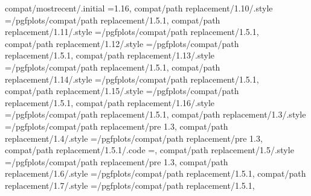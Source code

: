 {{{{{{{{{{{{{{{{{{{compat/mostrecent/.initial                                         =1.16,                                                                                                                              
compat/path replacement/1.10/.style                                ={/pgfplots/compat/path replacement/1.5.1},                                                                                         
compat/path replacement/1.11/.style                                ={/pgfplots/compat/path replacement/1.5.1},                                                                                         
compat/path replacement/1.12/.style                                ={/pgfplots/compat/path replacement/1.5.1},                                                                                         
compat/path replacement/1.13/.style                                ={/pgfplots/compat/path replacement/1.5.1},                                                                                         
compat/path replacement/1.14/.style                                ={/pgfplots/compat/path replacement/1.5.1},                                                                                         
compat/path replacement/1.15/.style                                ={/pgfplots/compat/path replacement/1.5.1},                                                                                         
compat/path replacement/1.16/.style                                ={/pgfplots/compat/path replacement/1.5.1},                                                                                         
compat/path replacement/1.3/.style                                 ={/pgfplots/compat/path replacement/pre 1.3},                                                                                      
compat/path replacement/1.4/.style                                 ={/pgfplots/compat/path replacement/pre 1.3},                                                                                       
compat/path replacement/1.5.1/.code                                ={\pgfplots@path@replace@ellipsetrue},                                                                                             
compat/path replacement/1.5/.style                                 ={/pgfplots/compat/path replacement/pre 1.3},                                                                                      
compat/path replacement/1.6/.style                                 ={/pgfplots/compat/path replacement/1.5.1},                                                                                         
compat/path replacement/1.7/.style                                 ={/pgfplots/compat/path replacement/1.5.1},                                                                                         
}}}}}}}}}}}}}}}}}}}

